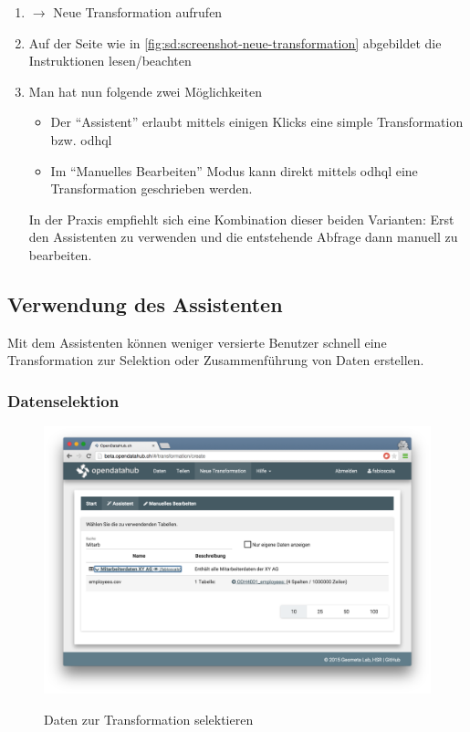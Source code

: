 \begin{enumerate}
\item {} $\to$ Neue Transformation aufrufen
\item Auf der Seite wie in \cref{fig:sd:screenshot-neue-transformation} abgebildet die Instruktionen lesen/beachten
\item Man hat nun folgende zwei Möglichkeiten
	\begin{itemize}
	\item Der ``Assistent'' erlaubt mittels einigen Klicks eine simple Transformation bzw. \acs{odhql} 
	\item Im ``Manuelles Bearbeiten'' Modus kann direkt mittels \acs{odhql} eine Transformation geschrieben werden.
	\end{itemize}
	In der Praxis empfiehlt sich eine Kombination dieser beiden Varianten: Erst den Assistenten zu verwenden und die entstehende Abfrage dann manuell zu bearbeiten.
\end{enumerate}


\subsection{Verwendung des Assistenten}

Mit dem Assistenten können weniger versierte Benutzer schnell eine Transformation zur Selektion oder Zusammenführung von Daten erstellen.

\subsubsection{Datenselektion}

\begin{figure}[H]
	\centering
	\includegraphics[width=\linewidth]{fig/screenshot-tabelle-selektieren}
	\label{fig:sd:screenshot-tabelle-selektieren}
	\caption{Daten zur Transformation selektieren}
\end{figure}

